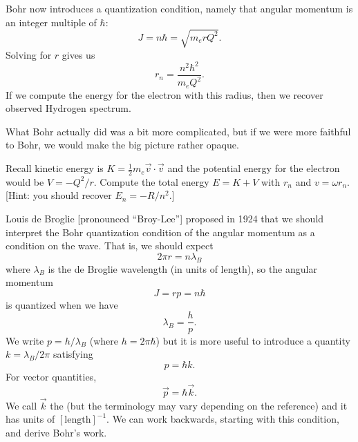 Bohr now introduces a quantization condition, namely that angular
momentum is an integer multiple of $\hbar$:
\begin{equation}
J = n\hbar = \sqrt{m_{e}rQ^{2}}.
\end{equation}
Solving for $r$ gives us
\begin{equation}
r_{n} = \frac{n^{2}\hbar^{2}}{m_{e}Q^{2}}.
\end{equation}
If we compute the energy for the electron with this radius, then we
recover observed Hydrogen spectrum.

\begin{remark}
What Bohr actually did was a bit more complicated, but if we were more
faithful to Bohr, we would make the big picture rather opaque.
\end{remark}

\begin{exercise}
Recall kinetic energy is $K=\frac{1}{2}m_{e}\vec{v}\cdot\vec{v}$ and the
potential energy for the electron would be $V = -Q^{2}/r$. Compute the
total energy $E = K + V$ with $r_{n}$ and $v=\omega r_{n}$. [Hint: you
  should recover $E_{n}=-R/n^{2}$.]
\end{exercise}

Louis de Broglie [pronounced ``Broy-Lee''] proposed in 1924 that we
should interpret the Bohr quantization condition of the angular momentum
as a condition on the wave. That is, we should expect
\begin{equation}
2\pi r = n\lambda_{B}
\end{equation}
where $\lambda_{B}$ is the de Broglie wavelength (in units of length), so
the angular momentum 
\begin{equation}
J = rp = n\hbar
\end{equation}
is quantized when we have
\begin{equation}
\lambda_{B} = \frac{h}{p}.
\end{equation}
We write $p = h/\lambda_{B}$ (where $h=2\pi\hbar$) but it is more useful
to introduce a quantity $k=\lambda_{B}/2\pi$ satisfying
\begin{equation}
p = \hbar k.
\end{equation}
For vector quantities,
\begin{equation}
\vec{p} = \hbar\vec{k}.
\end{equation}
We call $\vec{k}$ the  (but the terminology
may vary depending on the reference) and it has units of
$[\mbox{length}]^{-1}$. We can work backwards, starting with this
condition, and derive Bohr's work. 

